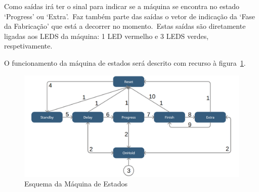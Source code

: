 Como saídas irá ter o sinal para indicar se a máquina se encontra no estado `Progress' ou `Extra'.\ Faz também parte das saídas o vetor de indicação da `Fase da Fabricação' que está a decorrer no momento.\ Estas saídas são diretamente ligadas aos LEDS da máquina: 1 LED vermelho e 3 LEDS verdes, respetivamente.

O funcionamento da máquina de estados será descrito com recurso à figura~\ref{fig:state-machine}.

\pagebreak

\begin{figure}
    \centering
    \includegraphics[scale=.4]{../images/state-machine}
    \caption{Esquema da Máquina de Estados}
    \label{fig:state-machine}
\end{figure}

